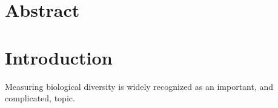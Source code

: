 \documentclass[12pt]{article}
\begin{document}
\section*{Abstract}

\section{Introduction}

Measuring biological diversity is widely recognized as an important, and complicated, topic.
\end{document}
